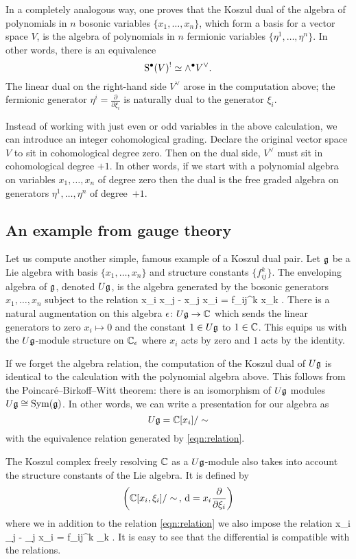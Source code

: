 \documentclass[11pt]{amsart}
\begin{document}
In a completely analogous way, one proves that the Koszul dual of the algebra of polynomials in $n$ bosonic variables $\{x_1,\ldots, x_n\}$, which form a basis for a vector space $V$, is the algebra of polynomials in $n$ fermionic variables $\{\eta^1,\ldots,\eta^n\}$. 
In other words, there is an equivalence
\[
{\rm S}^\bullet (V)^! \simeq \wedge^\bullet V^\vee .
\]
The linear dual on the right-hand side $V^{\vee}$ arose in the computation above; the fermionic generator $\eta^i = \frac{\partial}{\partial \xi_i}$ is naturally dual to the generator $\xi_i$. 

Instead of working with just even or odd variables in the above calculation, we can introduce an integer cohomological grading. 
Declare the original vector space $V$ to sit in cohomological degree zero. 
Then on the dual side, $V^\vee$ must sit in cohomological degree $+1$.
In other words, if we start with a polynomial algebra on variables $x_1,\ldots,x_n$ of degree zero then the dual is the free graded algebra on generators $\eta^1,\ldots,\eta^n$ of degree~$+1$.

\subsection{An example from gauge theory}


Let us compute another simple, famous example of a Koszul dual pair.
Let $\mathfrak g$ be a Lie algebra with basis $\{x_1,\ldots, x_n\}$ and structure constants $\{f_{ij}^k\}$. 
The enveloping algebra of $\mathfrak g$, denoted $U \mathfrak g$, is the algebra generated by the bosonic generators $x_1,\ldots,x_n$ subject to the relation 
\beqn \label{eqn:relation}
x_i x_j - x_j x_i = f_{ij}^k x_k .
\eeqn
There is a natural augmentation on this algebra $\epsilon \colon U \mathfrak g \to \mathbb C$ which sends the linear generators to zero $x_i \mapsto 0$ and the constant $1 \in U \mathfrak g$ to $1 \in \mathbb C$. 
This equips us with the $U \mathfrak g$-module structure on $\mathbb C_\epsilon$ where $x_i$ acts by zero and $1$ acts by the identity. 

If we forget the algebra relation, the computation of the Koszul dual of $U \mathfrak g$ is identical to the calculation with the polynomial algebra above. 
This follows from the Poincar\'e--Birkoff--Witt theorem: there is an isomorphism of $U\mathfrak g$ modules $U \mathfrak g \cong \operatorname{Sym} (\mathfrak g)$. 
In other words, we can write a presentation for our algebra as
\[
U \mathfrak g = \mathbb C[x_i] / \sim 
\]
with the equivalence relation generated by \eqref{eqn:relation}. 

The Koszul complex freely resolving $\mathbb C$ as a $U \mathfrak g$-module also takes into account the structure constants of the Lie algebra. 
It is defined by
\[
\left(\mathbb C[x_i,\xi_i] / \sim \, , \,{\rm d} =  x_i \frac{\partial}{\partial \xi_i} \right) 
\]
where we in addition to the relation \eqref{eqn:relation} we also impose the relation
\beqn \label{eqn:relation2}
x_i \xi_j - \xi_j x_i = f_{ij}^k \xi_k .
\eeqn
It is easy to see that the differential is compatible with the relations.
\end{document}
